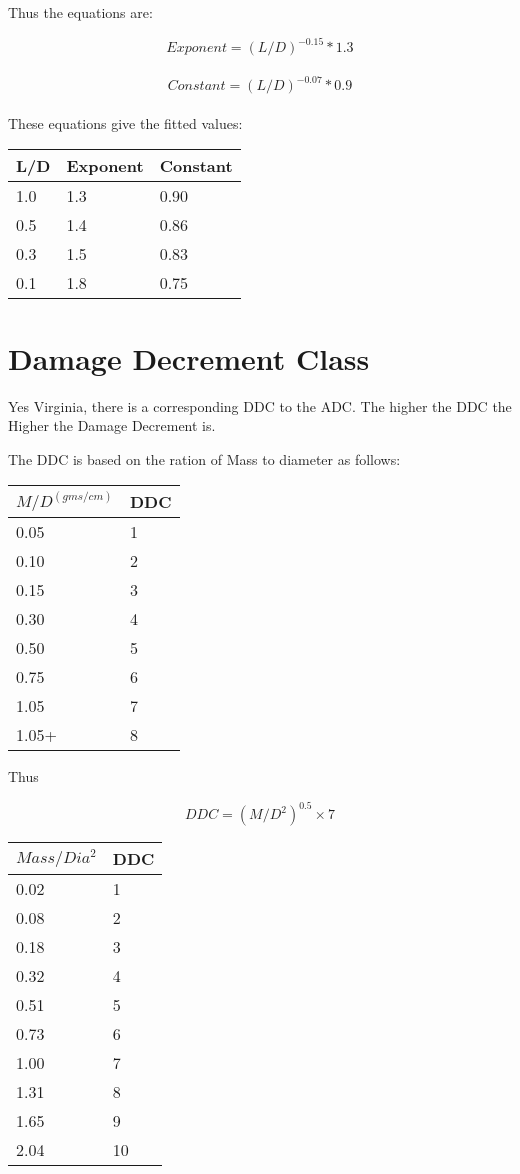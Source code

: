 Thus the equations are:

\[Exponent = (L/D)^{-0.15} * 1.3 \] \\  
\[Constant = (L/D)^{-0.07} * 0.9 \] \\

These equations give the fitted values:

\begin{tabular}{lll} \hline   
L/D	& Exponent	& Constant \\ \hline 
1.0 & 1.3       &  0.90 \\
0.5 & 1.4       &  0.86 \\
0.3 & 1.5       &  0.83 \\
0.1 & 1.8       &  0.75 \\ \hline 
\end{tabular}

\section{Damage Decrement Class}

Yes Virginia, there is a corresponding DDC to the ADC. The higher 
the DDC the Higher the Damage Decrement is.

The DDC is based on the ration of Mass to diameter as follows:

\begin{tabular}{ll} \hline 
\(M/D^{(gms/cm)} \)	&	DDC \\ \hline 
0.05				& 1 \\
0.10       	        & 2  \\
0.15				& 3 \\
0.30				& 4 \\
0.50				& 5 \\
0.75				& 6 \\
1.05				& 7 \\
1.05+				& 8 \\ \hline 
\end{tabular}

Thus 

\[ DDC = ( M/{D^2} ) ^ 0.5  \times 7 \]

\begin{tabular}{ll} \hline 
\(Mass/Dia^{2}\)    & DDC \\ \hline 
0.02			& 1 \\
0.08			& 2 \\
0.18			& 3 \\
0.32			& 4 \\
0.51			& 5 \\
0.73			& 6 \\
1.00			& 7 \\
1.31			& 8 \\
1.65			& 9 \\
2.04			& 10 \\ \hline 
\end{tabular}


